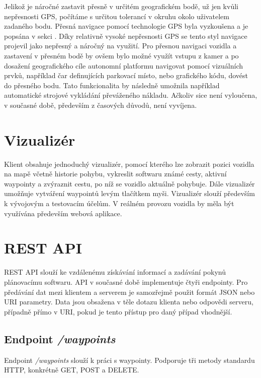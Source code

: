 \documentclass[czech, bachelor]{diploma}
\begin{document}
Jelikož je náročné zastavit přesně v určitém geografickém bodě, už jen kvůli nepřesnosti GPS, počítáme s určitou tolerancí
v okruhu okolo uživatelem zadaného bodu. Přesná navigace pomocí technologie GPS byla vyzkoušena a je popsána v sekci
. Díky relativně vysoké nepřesnosti GPS se tento styl navigace projevil jako nepřesný a náročný na využití.
Pro přesnou navigaci vozidla a zastavení v přesném bodě by ovšem bylo možné využít vstupu z kamer a po dosažení geografického cíle
autonomní platformu navigovat pomocí vizuálních prvků, například čar definujících parkovací místo, nebo grafického kódu, dovést
do přesného bodu. Tato funkcionalita by následně umožnila například automatické strojové vykládání převáženého nákladu. Ačkoliv
sice není vyloučena, v současné době, především z časových důvodů, není vyvíjena.

\section{Vizualizér} \label{visualizer}

Klient obsahuje jednoduchý vizualizér, pomocí kterého lze zobrazit pozici vozidla na mapě včetně historie pohybu, vykreslit
softwaru známé cesty, aktivní waypointy a zvýraznit cestu, po níž se vozidlo aktuálně pohybuje. Dále vizualizér umožňuje vytváření
waypointů levým tlačítkem myši. Vizualizér slouží především k vývojovým a testovacím účelům. V reálném provozu vozidla by měla
být využívána především webová aplikace.

\section{REST API} \label{rest-api}

REST API slouží ke vzdálenému získávání informací a zadávání pokynů plánovacímu softwaru. API v současné době implementuje čtyři
endpointy. Pro předávání dat mezi klientem a serverem je samozřejmě použit formát JSON nebo URI parametry. Data jsou obsažena
v těle dotazu klienta nebo odpovědi serveru, případně přímo v URI, pokud je tento přístup pro daný případ vhodnější.

\subsection{Endpoint \emph{/waypoints}}

Endpoint \emph{/waypoints} slouží k práci s waypointy. Podporuje tři metody standardu HTTP, konkrétně GET, POST a DELETE.
\end{document}
